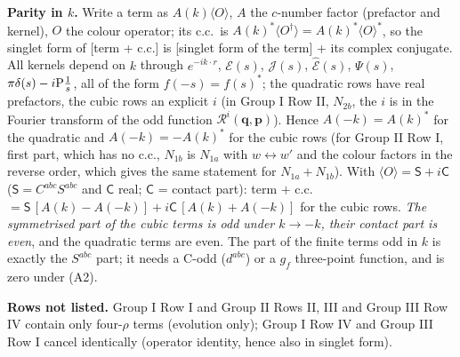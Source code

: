 \noindent\textbf{Parity in $k$.} Write a term as $A(k)\langle O\rangle$, $A$ the $c$-number factor (prefactor and kernel), $O$ the colour operator; its c.c.\ is $A(k)^{*}\langle O^{\dagger}\rangle=A(k)^{*}\langle O\rangle^{*}$, so the singlet form of [term + c.c.] is [singlet form of the term] + its complex conjugate. All kernels depend on $k$ through $e^{-ik\cdot r}$, $\mathcal{E}(s)$, $\mathcal{J}(s)$, $\widehat{\mathcal{E}}(s)$, $\Psi(s)$, $\pi\delta(s)-i{\rm P}\frac1s$, all of the form $f(-s)=f(s)^{*}$; the quadratic rows have real prefactors, the cubic rows an explicit $i$ (in Group I Row II, $N_{2b}$, the $i$ is in the Fourier transform of the odd function $\mathcal{R}^{i}(\mathbf{q},\mathbf{p})$). Hence $A(-k)=A(k)^{*}$ for the quadratic and $A(-k)=-A(k)^{*}$ for the cubic rows (for Group II Row I, first part, which has no c.c., $N_{1b}$ is $N_{1a}$ with $w\leftrightarrow w'$ and the colour factors in the reverse order, which gives the same statement for $N_{1a}+N_{1b}$). With $\langle O\rangle=\mathsf{S}+i\mathsf{C}$ ($\mathsf{S}=C^{abc}S^{abc}$ and $\mathsf{C}$ real; $\mathsf{C}$ = contact part): term $+$ c.c.\ $=\mathsf{S}\,[A(k)-A(-k)]+i\mathsf{C}\,[A(k)+A(-k)]$ for the cubic rows. \emph{The symmetrised part of the cubic terms is odd under $k\to-k$, their contact part is even}, and the quadratic terms are even. The part of the finite terms odd in $k$ is exactly the $S^{abc}$ part; it needs a C-odd ($d^{abc}$) or a $g_{f}$ three-point function, and is zero under (A2).

\noindent\textbf{Rows not listed.} Group I Row I and Group II Rows II, III and Group III Row IV contain only four-$\rho$ terms (evolution only); Group I Row IV and Group III Row I cancel identically (operator identity, hence also in singlet form).

